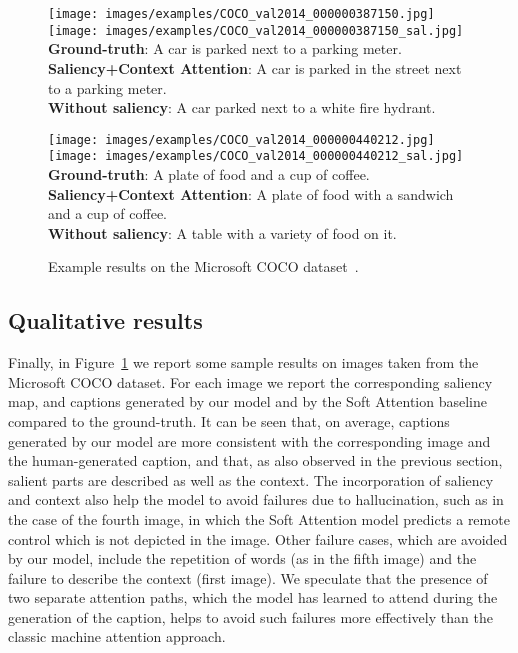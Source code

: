 \begin{figure}[t]
\begin{center}
\begin{minipage}[t]{0.32\linewidth}
    \texttt{[image: images/examples/COCO\_val2014\_000000387150.jpg]} 
    \texttt{[image: images/examples/COCO\_val2014\_000000387150\_sal.jpg]}  
    \scriptsize{
        \textbf{Ground-truth}: A car is parked next to a parking meter. \\
        \textbf{Saliency+Context Attention}: A car is parked in the street next to a parking meter. \\
        \textbf{Without saliency}: A car parked next to a white fire hydrant. \\
    }
    \end{minipage}
    \hspace{0.02cm}
    \begin{minipage}[t]{0.32\linewidth}
    \texttt{[image: images/examples/COCO\_val2014\_000000440212.jpg]} 
    \texttt{[image: images/examples/COCO\_val2014\_000000440212\_sal.jpg]}  
    \scriptsize{
        \textbf{Ground-truth}: A plate of food and a cup of coffee. \\
        \textbf{Saliency+Context Attention}: A plate of food with a sandwich and a cup of coffee. \\
        \textbf{Without saliency}: A table with a variety of food on it. \\
    }
    \end{minipage}
\end{center}
\caption{Example results on the Microsoft COCO dataset~\cite{lin2014microsoft}.}
\label{fig:samples}
\end{figure}



\subsection{Qualitative results}
Finally, in Figure~\ref{fig:samples} we report some sample results on images taken from the Microsoft COCO dataset. For each image we report the corresponding saliency map, and captions generated by our model and by the Soft Attention baseline compared to the ground-truth. It can be seen that, on average, captions generated by our model are more consistent with the corresponding image and the human-generated caption, and that, as also observed in the previous section, salient parts are described as well as the context. The incorporation of saliency and context also help the model to avoid failures due to hallucination, such as in the case of the fourth image, in which the Soft Attention model predicts a remote control which is not depicted in the image. Other failure cases, which are avoided by our model, include the repetition of words (as in the fifth image) and the failure to describe the context (first image). We speculate that the presence of two separate attention paths, which the model has learned to attend during the generation of the caption, helps to avoid such failures more effectively than the classic machine attention approach. 

